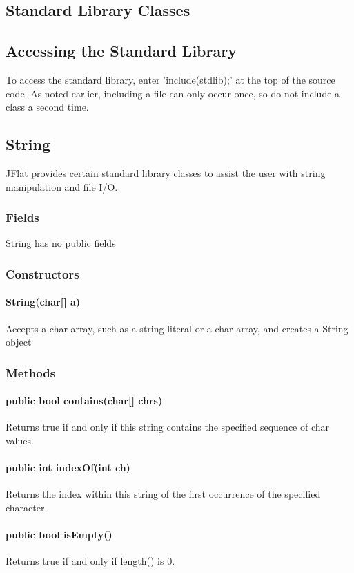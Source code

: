 \begin{homeworkProblem}
	\chapter{Standard Library Classes}
	\section{Accessing the Standard Library}
	To access the standard library, enter 'include(stdlib);' at the top of the source code. As noted earlier, including a file can only occur once, so do not include a class a second time. 
	
	\section{String}
	JFlat provides certain standard library classes to assist the user with string manipulation and file I/O.

	\subsection{Fields}
	String has no public fields

	\subsection{Constructors}
	\subsubsection{String(char[] a)}
	Accepts a char array, such as a string literal or a char array, and creates a String object

	\subsection{Methods}
	\subsubsection{public bool contains(char[] chrs)}
	Returns true if and only if this string contains the specified sequence of char values.
	\subsubsection{public int indexOf(int ch)}
	Returns the index within this string of the first occurrence of the specified character.
	\subsubsection{public bool isEmpty()}
	Returns true if and only if length() is 0.

\end{homeworkProblem}
